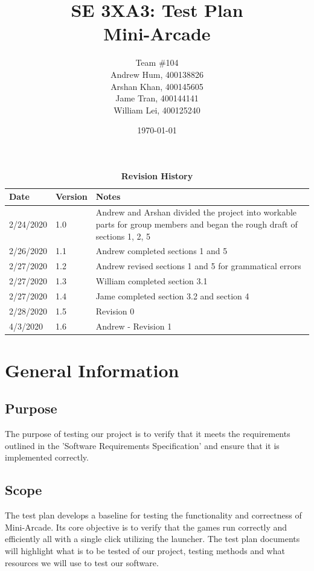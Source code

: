 \documentclass[12pt, titlepage]{article}
\title{SE 3XA3: Test Plan\\Mini-Arcade}
\author{Team \#104
		\\ Andrew Hum, 400138826
		\\ Arshan Khan, 400145605
		\\ Jame Tran, 400144141
		\\ William Lei, 400125240
}
\date{\today}
\begin{document}
\maketitle

\tableofcontents
\listoftables
\listoffigures

\begin{table}[hbp]
\caption{\bf Revision History}
\begin{tabularx}{\textwidth}{p{3cm}p{2cm}X}
\toprule {\bf Date} & {\bf Version} & {\bf Notes}\\
\midrule
2/24/2020 & 1.0 & Andrew and Arshan divided the project into workable parts for group members and began the rough draft of sections 1, 2, 5\\
2/26/2020 & 1.1 & Andrew completed sections 1 and 5\\
2/27/2020 & 1.2 & Andrew revised sections 1 and 5 for grammatical errors\\
2/27/2020 & 1.3 & William completed section 3.1\\
2/27/2020 & 1.4 & Jame completed section 3.2 and section 4\\
2/28/2020 & 1.5 & Revision 0\\
4/3/2020 & 1.6 & Andrew - Revision 1\\
\bottomrule
\end{tabularx}
\end{table}

\newpage


\section{General Information}

\subsection{Purpose}

The purpose of testing our project is to verify that it meets the requirements outlined in the 'Software Requirements Specification' and ensure that it is implemented correctly.

\subsection{Scope}

The test plan develops a baseline for testing the functionality and correctness of Mini-Arcade. Its core objective is to verify that the games run correctly and efficiently all with a single click utilizing the launcher. The test plan documents will highlight what is to be tested of our project, testing methods and what resources we will use to test our software.
\end{document}
